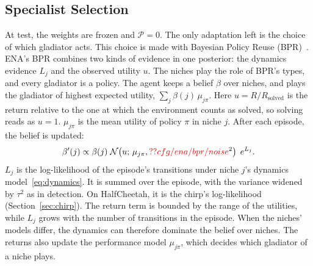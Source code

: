 \subsection{Specialist Selection}
\label{sec:selection}
At test, the weights are frozen and $\mathcal{P}=0$. The only adaptation left is the choice of which gladiator acts. This choice is made with Bayesian Policy Reuse (BPR)~\citep{rosman2016bayesian}. ENA's BPR combines two kinds of evidence in one posterior: the dynamics evidence $L_j$ and the observed utility $u$. The niches play the role of BPR's types, and every gladiator is a policy. The agent keeps a belief $\beta$ over niches, and plays the gladiator of highest expected utility, $\sum_{j}\beta(j)\,\mu_{j\pi}$. Here $u = R/R_{\text{solved}}$ is the return relative to the one at which the environment counts as solved, so solving reads as $u = 1$. $\mu_{j\pi}$ is the mean utility of policy $\pi$ in niche $j$. After each episode, the belief is updated:
\begin{equation}
\beta'(j) \propto \beta(j)\; \mathcal{N}\!\left(u;\, \mu_{j\pi}, \Res{cfg/ena/bpr/noise}^2\right)\; e^{L_j}.
\label{eq:bpr}
\end{equation}
$L_j$ is the log-likelihood of the episode's transitions under niche $j$'s dynamics model~\eqref{eq:dynamics}. It is summed over the episode, with the variance widened by $\tau^2$ as in detection. On HalfCheetah, it is the chirp's log-likelihood (Section~\ref{sec:chirp}). The return term is bounded by the range of the utilities, while $L_j$ grows with the number of transitions in the episode. When the niches' models differ, the dynamics can therefore dominate the belief over niches. The returns also update the performance model $\mu_{j\pi}$, which decides which gladiator of a niche plays.

